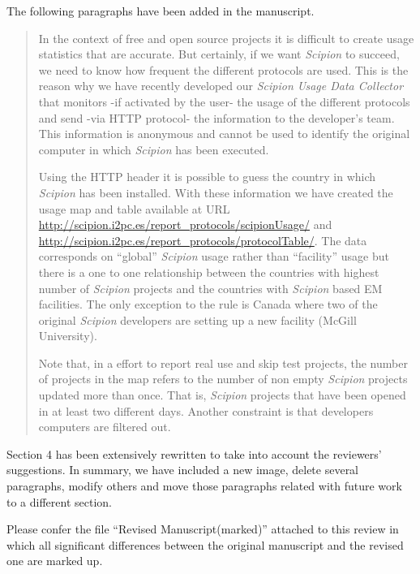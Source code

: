 \documentclass[a4paper,12pt]{article}
\def\scipion{\textit{Scipion}\xspace}
\begin{document}
\begin{reviewer}
\reply The following paragraphs have been added in the manuscript.

\begin{quote}

In the context of free and open source projects it is difficult to create usage statistics that are accurate. But certainly, if we want \scipion to succeed, we need to 
know how frequent the different protocols are used. This is the reason why we have recently developed our \textit{Scipion Usage Data Collector} that monitors -if activated by the user- the usage of the different protocols and send -via HTTP protocol- the information to the developer's team. This information is anonymous and cannot be used to identify the original computer in which \scipion has been executed. 

Using the HTTP header it is possible to guess the country in which \scipion has been installed. With these information we have created the usage map and table available at URL \url{http://scipion.i2pc.es/report_protocols/scipionUsage/} and  \url{http://scipion.i2pc.es/report_protocols/protocolTable/}. The data corresponds on ``global'' \scipion usage rather than ``facility'' usage but there 
is a one to one relationship between the  countries with highest number of \scipion projects and the countries with \scipion based EM facilities. The only exception to the rule is Canada where two of the original \scipion developers are setting up a new facility (McGill University).

Note that, in a effort to report real use and skip test projects, the number of projects in the map refers to the number of non empty \scipion projects updated more than once. That is, 
\scipion projects that have been opened in at least two different days. Another constraint is that developers computers are filtered out.
\end{quote}



\reply Section 4 has been extensively rewritten to take into account the reviewers' suggestions. In summary, we have included a new image, delete several paragraphs, modify others and move those paragraphs related with future work to a different section.

Please confer the file ``Revised Manuscript(marked)'' attached to this review in which 
all significant differences between the original manuscript and the revised one are marked up.


\end{reviewer}
\end{document}
